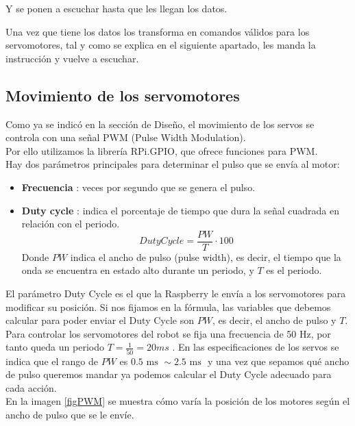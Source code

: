 \documentclass[twoside, 11pt]{epstfg}
\begin{document}
Y se ponen a escuchar hasta que les llegan los datos.

Una vez que tiene los datos los transforma en comandos válidos para los servomotores, tal y como se explica en el siguiente apartado, les manda la instrucción y vuelve a escuchar.


\subsection{Movimiento de los servomotores}\label{sub:movS}


Como ya se indicó en la sección de Diseño, el movimiento de los servos se controla con una señal PWM (Pulse Width Modulation).\\
Por ello utilizamos la librería RPi.GPIO, que ofrece funciones para PWM.\\
Hay dos parámetros principales para determinar el pulso que se envía al motor:
\begin{itemize}
	\item \textbf{Frecuencia} : veces por segundo que se genera el pulso.
	\item \textbf{Duty cycle} : indica el porcentaje de tiempo que dura la señal cuadrada en relación con el periodo.
	$$DutyCycle = \frac{PW}{T}\cdot 100$$
	Donde $PW$ indica el ancho de pulso (pulse width), es decir, el tiempo que la onda se encuentra en estado alto durante un periodo, y $T$ es el periodo.
\end{itemize}

El parámetro Duty Cycle es el que la Raspberry le envía a los servomotores para modificar su posición. Si nos fijamos en la fórmula, las variables que debemos calcular para poder enviar el Duty Cycle son $PW$, es decir, el ancho de pulso y $T$.\\
Para controlar los servomotores del robot se fija una frecuencia de 50 Hz, por tanto queda un periodo $T = \frac{1}{50} = 20 ms$ .
En las especificaciones de los servos se indica que el rango de $PW$ es $0.5 \text{ ms } \sim 2.5\text{ ms }$ y una vez que sepamos qué ancho de pulso queremos mandar ya podemos calcular el Duty Cycle adecuado para cada acción.\\
En la imagen \ref{figPWM} se muestra cómo varía la posición de los motores según el ancho de pulso que se le envíe.
\end{document}
